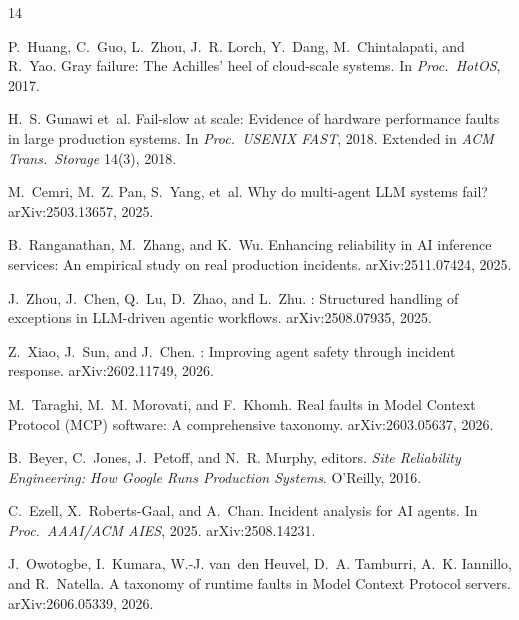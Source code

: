 \documentclass[11pt]{article}
\begin{document}









\begin{thebibliography}{14}\small

P.~Huang, C.~Guo, L.~Zhou, J.~R. Lorch, Y.~Dang, M.~Chintalapati, and
R.~Yao.
\newblock Gray failure: The Achilles' heel of cloud-scale systems.
\newblock In \emph{Proc.\ HotOS}, 2017.

H.~S. Gunawi et~al.
\newblock Fail-slow at scale: Evidence of hardware performance faults in
  large production systems.
\newblock In \emph{Proc.\ USENIX FAST}, 2018. Extended in \emph{ACM
  Trans.\ Storage} 14(3), 2018.

M.~Cemri, M.~Z. Pan, S.~Yang, et~al.
\newblock Why do multi-agent {LLM} systems fail?
\newblock arXiv:2503.13657, 2025.

B.~Ranganathan, M.~Zhang, and K.~Wu.
\newblock Enhancing reliability in {AI} inference services: An empirical
  study on real production incidents.
\newblock arXiv:2511.07424, 2025.

J.~Zhou, J.~Chen, Q.~Lu, D.~Zhao, and L.~Zhu.
: Structured handling of exceptions in {LLM}-driven
  agentic workflows.
\newblock arXiv:2508.07935, 2025.

Z.~Xiao, J.~Sun, and J.~Chen.
: Improving agent safety through incident response.
\newblock arXiv:2602.11749, 2026.

M.~Taraghi, M.~M. Morovati, and F.~Khomh.
\newblock Real faults in {Model Context Protocol} ({MCP}) software: A
  comprehensive taxonomy.
\newblock arXiv:2603.05637, 2026.

B.~Beyer, C.~Jones, J.~Petoff, and N.~R. Murphy, editors.
\newblock \emph{Site Reliability Engineering: How Google Runs Production
  Systems}.
\newblock O'Reilly, 2016.

C.~Ezell, X.~Roberts-Gaal, and A.~Chan.
\newblock Incident analysis for {AI} agents.
\newblock In \emph{Proc.\ AAAI/ACM AIES}, 2025. arXiv:2508.14231.

J.~Owotogbe, I.~Kumara, W.-J. van~den Heuvel, D.~A. Tamburri, A.~K.
  Iannillo, and R.~Natella.
\newblock A taxonomy of runtime faults in {Model Context Protocol}
  servers.
\newblock arXiv:2606.05339, 2026.


\end{thebibliography}
\end{document}
